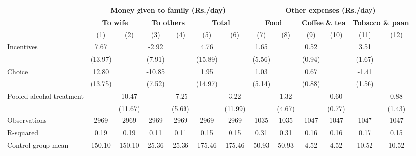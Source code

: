 \begin{tabular}{l c c c c c c c c c c c c} \toprule  & \multicolumn{6}{c}{\textbf{Money given to family (Rs./day)}} & \multicolumn{6}{c}{\textbf{Other expenses (Rs./day)}} \\ \cmidrule(lr){2-7} \cmidrule(lr){8-13} & \multicolumn{2}{c}{\textbf{To wife}} & \multicolumn{2}{c}{\textbf{To others}} & \multicolumn{2}{c}{\textbf{Total}} & \multicolumn{2}{c}{\textbf{Food}} & \multicolumn{2}{c}{\textbf{Coffee \& tea}} & \multicolumn{2}{c}{\textbf{Tobacco \& paan}} \\\cmidrule(lr){2-3} \cmidrule(lr){4-5} \cmidrule(lr){6-7} \cmidrule(lr){8-9} \cmidrule(lr){10-11} \cmidrule(lr){12-13}&\multicolumn{1}{c}{(1)}&\multicolumn{1}{c}{(2)}&\multicolumn{1}{c}{(3)}&\multicolumn{1}{c}{(4)}&\multicolumn{1}{c}{(5)}&\multicolumn{1}{c}{(6)}&\multicolumn{1}{c}{(7)}&\multicolumn{1}{c}{(8)}&\multicolumn{1}{c}{(9)}&\multicolumn{1}{c}{(10)}&\multicolumn{1}{c}{(11)}&\multicolumn{1}{c}{(12)}\\
\midrule
Incentives          &        7.67&            &       -2.92&            &        4.76&            &        1.65&            &        0.52&            &        3.51&            \\
                    &     (13.97)&            &      (7.91)&            &     (15.89)&            &      (5.56)&            &      (0.94)&            &      (1.67)&            \\
\addlinespace
Choice              &       12.80&            &      -10.85&            &        1.95&            &        1.03&            &        0.67&            &       -1.41&            \\
                    &     (13.75)&            &      (7.52)&            &     (14.97)&            &      (5.14)&            &      (0.88)&            &      (1.56)&            \\
\addlinespace
Pooled alcohol treatment&            &       10.47&            &       -7.25&            &        3.22&            &        1.32&            &        0.60&            &        0.88\\
                    &            &     (11.67)&            &      (5.69)&            &     (11.99)&            &      (4.67)&            &      (0.77)&            &      (1.43)\\
\midrule
Observations        &        2969&        2969&        2969&        2969&        2969&        2969&        1035&        1035&        1047&        1047&        1047&        1047\\
R-squared           &        0.19&        0.19&        0.11&        0.11&        0.15&        0.15&        0.31&        0.31&        0.16&        0.16&        0.17&        0.15\\
Control group mean  &      150.10&      150.10&       25.36&       25.36&      175.46&      175.46&       50.93&       50.93&        4.52&        4.52&       10.52&       10.52\\
\bottomrule \end{tabular} 